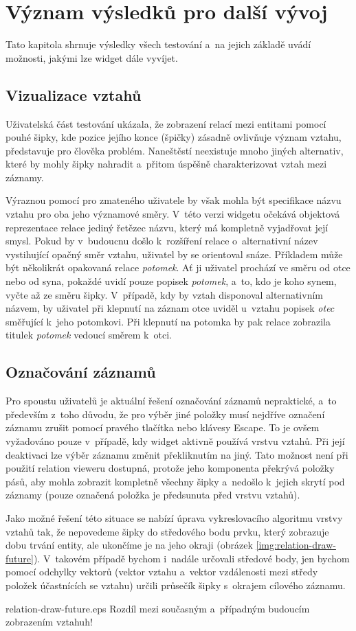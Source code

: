 		
	\section{Význam výsledků pro další vývoj}
	Tato kapitola shrnuje výsledky všech testování a~na jejich základě uvádí možnosti, jakými lze widget dále vyvíjet.
		
		\subsection{Vizualizace vztahů}
		Uživatelská část testování ukázala, že zobrazení relací mezi entitami pomocí pouhé šipky, kde pozice jejího konce (špičky) zásadně ovlivňuje význam vztahu, představuje pro člověka problém. Naneštěstí neexistuje mnoho jiných alternativ, které by mohly šipky nahradit a~přitom úspěšně charakterizovat vztah mezi záznamy. 
		
		Výraznou pomocí pro zmateného uživatele by však mohla být specifikace názvu vztahu pro oba jeho významové směry. V~této verzi widgetu očekává objektová reprezentace relace jediný řetězec názvu, který má kompletně vyjadřovat její smysl. Pokud by v~budoucnu došlo k~rozšíření relace o~alternativní název vystihující opačný směr vztahu, uživatel by se orientoval snáze. Příkladem může být několikrát opakovaná relace \emph{potomek}. Ať ji uživatel prochází ve směru od otce nebo od syna, pokaždé uvidí pouze popisek \emph{potomek}, a~to, kdo je koho synem, vyčte až ze směru šipky. V~případě, kdy by vztah disponoval alternativním názvem, by uživatel při klepnutí na záznam otce uviděl u~vztahu popisek \emph{otec} směřující k~jeho potomkovi. Při klepnutí na potomka by pak relace zobrazila titulek \emph{potomek} vedoucí směrem k~otci.
		
		\subsection{Označování záznamů}
		Pro spoustu uživatelů je aktuální řešení označování záznamů nepraktické, a~to především z~toho důvodu, že pro výběr jiné položky musí nejdříve označení záznamu zrušit pomocí pravého tlačítka nebo klávesy {\sf Escape}. To je ovšem vyžado\-váno pouze v~případě, kdy widget aktivně používá vrstvu vztahů. Při její deaktivaci lze výběr záznamu změnit překliknutím na jiný. Tato možnost není při použití relation vieweru dostupná, protože jeho komponenta překrývá položky pásů, aby mohla zobrazit kompletně všechny šipky a~nedošlo k~jejich skrytí pod záznamy (pouze označená položka je předsunuta před vrstvu vztahů).
		
		Jako možné řešení této situace se nabízí úprava vykreslovacího algoritmu vrstvy vztahů tak, že nepovedeme šipky do středového bodu prvku, který zobrazuje dobu trvání entity, ale ukončíme je na jeho okraji (obrázek \ref{img:relation-draw-future}). V~takovém případě bychom i~nadále určovali středové body, jen bychom pomocí odchylky vektorů (vektor vztahu a~vektor vzdálenosti mezi středy položek účastnících se vztahu) určili průsečík šipky s~okrajem cílového záznamu.
		
		{}{relation-draw-future.eps}
		{Rozdíl mezi současným a~případným budoucím zobrazením vztahu}{h!}
	